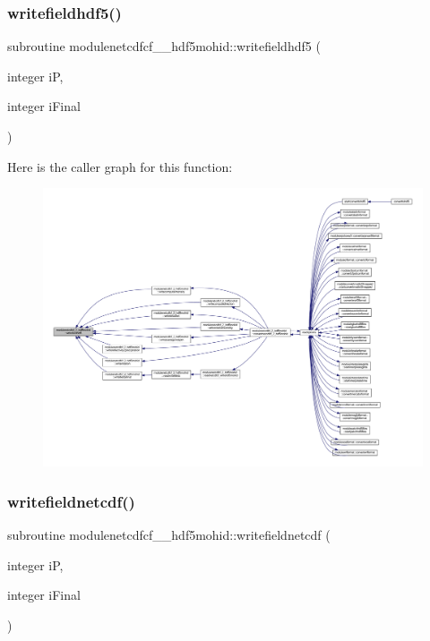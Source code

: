 \subsubsection{\texorpdfstring{writefieldhdf5()}{writefieldhdf5()}}
{\footnotesize\ttfamily subroutine modulenetcdfcf\+\_\+\_\+hdf5mohid\+::writefieldhdf5 (\begin{DoxyParamCaption}\item[{integer}]{iP,  }\item[{integer}]{i\+Final }\end{DoxyParamCaption})\hspace{0.3cm}{\ttfamily [private]}}

Here is the caller graph for this function\+:\nopagebreak
\begin{figure}[H]
\begin{center}
\leavevmode
\includegraphics[width=350pt]{namespacemodulenetcdfcf__2__hdf5mohid_a9a0ad1eb97650a07ad08d1d3d20271ad_icgraph}
\end{center}
\end{figure}
\mbox{\label{namespacemodulenetcdfcf__2__hdf5mohid_ab5904631b48441b51fae172f8cfe49f4}} 
\subsubsection{\texorpdfstring{writefieldnetcdf()}{writefieldnetcdf()}}
{\footnotesize\ttfamily subroutine modulenetcdfcf\+\_\+\_\+hdf5mohid\+::writefieldnetcdf (\begin{DoxyParamCaption}\item[{integer}]{iP,  }\item[{integer}]{i\+Final }\end{DoxyParamCaption})\hspace{0.3cm}{\ttfamily [private]}}

